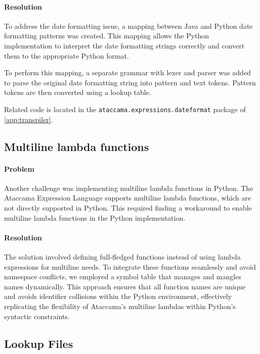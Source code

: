 \paragraph{Resolution}

To address the date formatting issue, a mapping between Java and Python date formatting patterns was created. This mapping allows the Python implementation to interpret the date formatting strings correctly and convert them to the appropriate Python format.

To perform this mapping, a separate grammar with lexer and parser was added to parse the original date formatting string into pattern and text tokens. Pattern tokens are then converted using a lookup table.

Related code is located in the \texttt{ataccama.expressions.dateformat} package of \ref{app:transpiler}. 

\subsection{Multiline lambda functions}

\paragraph{Problem}

Another challenge was implementing multiline lambda functions in Python. The Ataccama Expression Language supports multiline lambda functions, which are not directly supported in Python\cite{pythonlambdas}. This required finding a workaround to enable multiline lambda functions in the Python implementation.

\paragraph{Resolution}

The solution involved defining full-fledged functions instead of using lambda expressions for multiline needs. To integrate these functions seamlessly and avoid namespace conflicts, we employed a symbol table that manages and mangles names dynamically. This approach ensures that all function names are unique and avoids identifier collisions within the Python environment, effectively replicating the flexibility of Ataccama's multiline lambdas within Python's syntactic constraints.
\subsection{Lookup Files}

